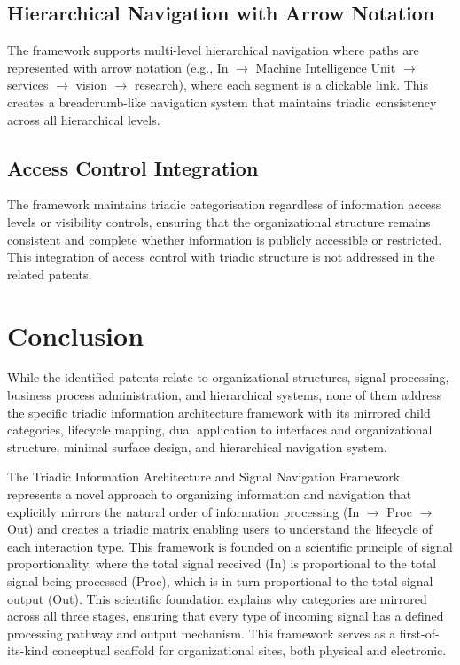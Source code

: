 \documentclass[11pt,a4paper]{article}
\begin{document}
\subsection*{Hierarchical Navigation with Arrow Notation}
The framework supports multi-level hierarchical navigation where paths are represented with arrow notation (e.g., In $\rightarrow$ Machine Intelligence Unit $\rightarrow$ services $\rightarrow$ vision $\rightarrow$ research), where each segment is a clickable link. This creates a breadcrumb-like navigation system that maintains triadic consistency across all hierarchical levels.

\subsection*{Access Control Integration}
The framework maintains triadic categorisation regardless of information access levels or visibility controls, ensuring that the organizational structure remains consistent and complete whether information is publicly accessible or restricted. This integration of access control with triadic structure is not addressed in the related patents.

\section*{Conclusion}

While the identified patents relate to organizational structures, signal processing, business process administration, and hierarchical systems, none of them address the specific triadic information architecture framework with its mirrored child categories, lifecycle mapping, dual application to interfaces and organizational structure, minimal surface design, and hierarchical navigation system.

The Triadic Information Architecture and Signal Navigation Framework represents a novel approach to organizing information and navigation that explicitly mirrors the natural order of information processing (In $\rightarrow$ Proc $\rightarrow$ Out) and creates a triadic matrix enabling users to understand the lifecycle of each interaction type. This framework is founded on a scientific principle of signal proportionality, where the total signal received (In) is proportional to the total signal being processed (Proc), which is in turn proportional to the total signal output (Out). This scientific foundation explains why categories are mirrored across all three stages, ensuring that every type of incoming signal has a defined processing pathway and output mechanism. This framework serves as a first-of-its-kind conceptual scaffold for organizational sites, both physical and electronic.
\end{document}
